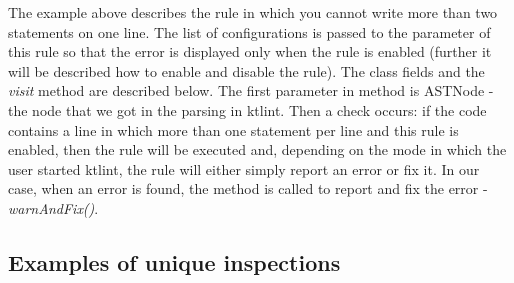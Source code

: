 The example above describes the rule in which you cannot write more than two statements on one line. The list of configurations is passed to the parameter of this rule so that the error is displayed only when the rule is enabled (further it will be described how to enable and disable the rule). The class fields and the \textsl{visit} method are described below. The first parameter in method is ASTNode - the node that we got in the parsing in ktlint. Then a check occurs: if the code contains a line in which more than one statement per line and this rule is enabled, then the rule will be executed and, depending on the mode in which the user started ktlint, the rule will either simply report an error or fix it. In our case, when an error is found, the method is called to report and fix the error - \textsl{warnAndFix()}.

\subsection{Examples of unique inspections}
\par
